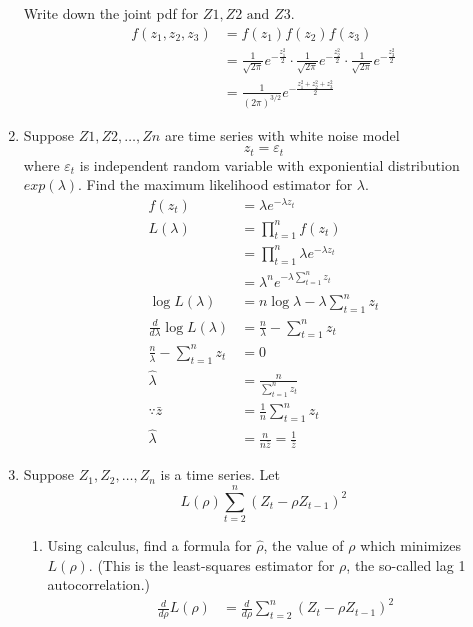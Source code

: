 \documentclass[12pt]{article}
\begin{document}
\begin{enumerate}
    Write down the joint pdf for $Z1, Z2 \text{ and } Z3$.
    \begin{align*}
        f(z_1, z_2, z_3) &= f(z_1) f(z_2) f(z_3) \\
        &= \frac{1}{\sqrt{2\pi}} e^{-\frac{z_1^2}{2}} \cdot \frac{1}{\sqrt{2\pi}} e^{-\frac{z_2^2}{2}} \cdot \frac{1}{\sqrt{2\pi}} e^{-\frac{z_3^2}{2}} \\
        &= \frac{1}{(2\pi)^{3/2}} e^{-\frac{z_1^2 + z_2^2 + z_3^2}{2}}
    \end{align*}
    \item  Suppose $Z1, Z2, \ldots , Zn$ are time series with white noise model
    \[ z_t = \varepsilon_t \]
    where $\varepsilon_t$ is independent random variable with exponiential distribution $exp(\lambda)$.
    Find the maximum likelihood estimator for $\lambda$.
    \begin{align*}
        f(z_t) &= \lambda e^{-\lambda z_t} \\
        L(\lambda) &= \prod_{t=1}^{n} f(z_t) \\
        &= \prod_{t=1}^{n} \lambda e^{-\lambda z_t} \\
        &= \lambda^n e^{-\lambda \sum_{t=1}^{n} z_t} \\
        \log L(\lambda) &= n \log \lambda - \lambda \sum_{t=1}^{n} z_t \\
        \frac{d}{d\lambda} \log L(\lambda) &= \frac{n}{\lambda} - \sum_{t=1}^{n} z_t \\
        \frac{n}{\lambda} - \sum_{t=1}^{n} z_t &= 0 \\
        \hat{\lambda} &= \frac{n}{\sum_{t=1}^{n} z_t} \\
        \because \bar{z} &= \frac{1}{n} \sum_{t=1}^{n} z_t \\
        \hat{\lambda} &= \frac{n}{n \bar{z}} = \frac{1}{\bar{z}}
    \end{align*}
    \item Suppose $Z_1, Z_2, \ldots, Z_n$ is a time series. Let 
    \[ L(\rho) \sum_{t = 2}^{n}(Z_t - \rho Z_{t-1})^2 \]
    \begin{enumerate}
        \item  Using calculus, find a formula for $\hat{\rho}$, the value of $\rho$ 
        which minimizes $L(\rho)$. (This is the least-squares estimator for $\rho$, 
        the so-called lag 1 autocorrelation.)
        \begin{align*}
            \frac{d}{d\rho} L(\rho) &= \frac{d}{d\rho} \sum_{t = 2}^{n}(Z_t - \rho Z_{t-1})^2 \\

\end{align*}
\end{enumerate}
\end{enumerate}
\end{document}
